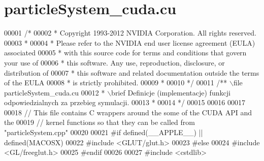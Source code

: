 \hypertarget{particle_system__cuda_8cu_source}{\section{particle\-System\-\_\-cuda.\-cu}
}

\begin{DoxyCode}
00001 \textcolor{comment}{/*}
00002 \textcolor{comment}{ * Copyright 1993-2012 NVIDIA Corporation.  All rights reserved.}
00003 \textcolor{comment}{ *}
00004 \textcolor{comment}{ * Please refer to the NVIDIA end user license agreement (EULA) associated}
00005 \textcolor{comment}{ * with this source code for terms and conditions that govern your use of}
00006 \textcolor{comment}{ * this software. Any use, reproduction, disclosure, or distribution of}
00007 \textcolor{comment}{ * this software and related documentation outside the terms of the EULA}
00008 \textcolor{comment}{ * is strictly prohibited.}
00009 \textcolor{comment}{ *}
00010 \textcolor{comment}{ */}
00011   \textcolor{comment}{/** \(\backslash\)file particleSystem\_cuda.cu}
00012 \textcolor{comment}{  * \(\backslash\)brief Definicje (implementacje) funkcji odpowiedzialnych za przebieg symulacji.}
00013 \textcolor{comment}{  *}
00014 \textcolor{comment}{  */}
00015 
00016 
00017 
00018 \textcolor{comment}{// This file contains C wrappers around the some of the CUDA API and the}
00019 \textcolor{comment}{// kernel functions so that they can be called from "particleSystem.cpp"}
00020 
00021 \textcolor{preprocessor}{#}\textcolor{preprocessor}{if} \textcolor{preprocessor}{defined}\textcolor{preprocessor}{(}\textcolor{preprocessor}{\_\_APPLE\_\_}\textcolor{preprocessor}{)} \textcolor{preprocessor}{||} \textcolor{preprocessor}{defined}\textcolor{preprocessor}{(}\textcolor{preprocessor}{MACOSX}\textcolor{preprocessor}{)}
00022 \textcolor{preprocessor}{#}\textcolor{preprocessor}{include} \textcolor{preprocessor}{<}\textcolor{preprocessor}{GLUT}\textcolor{preprocessor}{/}\textcolor{preprocessor}{glut}\textcolor{preprocessor}{.}\textcolor{preprocessor}{h}\textcolor{preprocessor}{>}
00023 \textcolor{preprocessor}{#}\textcolor{preprocessor}{else}
00024 \textcolor{preprocessor}{#}\textcolor{preprocessor}{include} \textcolor{preprocessor}{<}\textcolor{preprocessor}{GL}\textcolor{preprocessor}{/}\textcolor{preprocessor}{freeglut}\textcolor{preprocessor}{.}\textcolor{preprocessor}{h}\textcolor{preprocessor}{>}
00025 \textcolor{preprocessor}{#}\textcolor{preprocessor}{endif}
00026 
00027 \textcolor{preprocessor}{#}\textcolor{preprocessor}{include} \textcolor{preprocessor}{<}\textcolor{preprocessor}{cstdlib}\textcolor{preprocessor}{>}

\end{DoxyCode}
